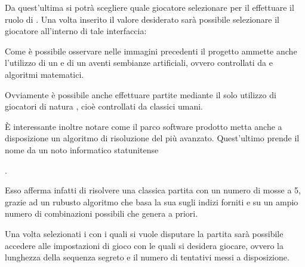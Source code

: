 \documentclass[letterpaper,10pt,italian,openany,oneside]{sphinxmanual}
\begin{document}
Da quest’ultima si potrà scegliere quale giocatore selezionare per il effettuare il ruolo di .
Una volta inserito il valore desiderato sarà possibile selezionare il giocatore  all’interno di tale interfaccia:

\noindent{}

Come è possibile osservare nelle immagini precedenti il progetto ammette anche l’utilizzo di un  e di un  aventi sembianze artificiali, ovvero controllati da  e  algoritmi matematici.

Ovviamente è possibile anche effettuare partite mediante il solo utilizzo di giocatori di natura , cioè controllati da classici  umani.

È interessante inoltre notare come il parco software prodotto metta anche a disposizione un algoritmo di risoluzione del  più avanzato. Quest’ultimo prende il nome da un noto informatico statunitense  %
\begin{footnote}[2]\sphinxAtStartFootnote
{}
%
\end{footnote}.

Esso afferma infatti di risolvere una classica partita con un numero di mosse  a 5, grazie ad un rubusto algoritmo che basa la sua  sugli indizi forniti e su un ampio numero di combinazioni possibili che genera a priori.

Una volta selezionati i  con i quali si vuole disputare la partita sarà possibile accedere alle impostazioni di gioco con le quali si desidera giocare, ovvero la lunghezza della sequenza segreto e il numero di tentativi messi a disposizione.
\end{document}
